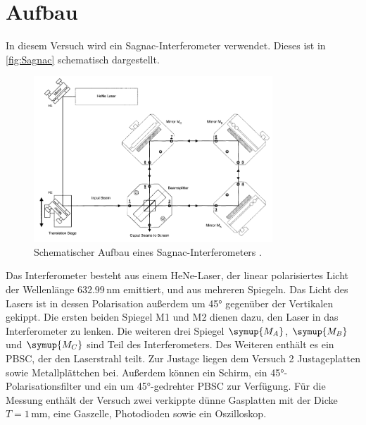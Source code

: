 \section{Aufbau}
\label{sec:Aufbau}
In diesem Versuch wird ein Sagnac-Interferometer verwendet. Dieses ist in \autoref{fig:Sagnac}
schematisch dargestellt. 
\begin{figure}
    \centering
    \includegraphics[width=0.8\textwidth]{Sagnac.png}
    \caption{Schematischer Aufbau eines Sagnac-Interferometers \cite{ap64}.}
    \label{fig:Sagnac}
\end{figure}
Das Interferometer besteht aus einem HeNe-Laser, der linear polarisiertes Licht der Wellenlänge $632.99\,\unit{\nano\meter}$
emittiert, und aus mehreren Spiegeln. Das Licht des Lasers ist in dessen Polarisation außerdem um 45° gegenüber der Vertikalen gekippt.
Die ersten beiden Spiegel M1 und M2 dienen dazu, den Laser in das Interferometer zu lenken. Die weiteren drei Spiegel $\symup{M_A}$, 
$\symup{M_B}$ und $\symup{M_C}$ sind Teil des Interferometers. Des Weiteren enthält es ein PBSC, der den Laserstrahl teilt.
Zur Justage liegen dem Versuch 2 Justageplatten sowie Metallplättchen bei. Außerdem können ein Schirm, ein 45°-Polarisationsfilter und ein um 45°-gedrehter
PBSC zur Verfügung. 
Für die Messung enthält der Versuch zwei verkippte dünne Gasplatten mit der Dicke $T=1\,\mathrm{mm}$, eine Gaszelle, Photodioden sowie
ein Oszilloskop.